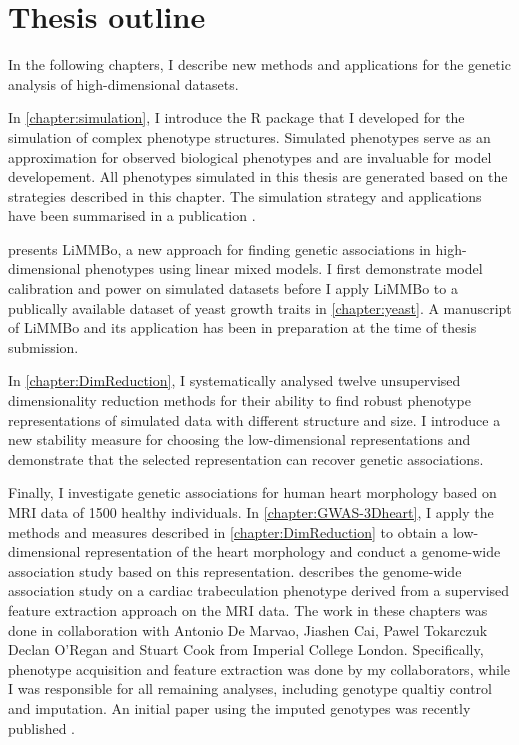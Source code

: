 \section{Thesis outline}
In the following chapters, I describe new methods and applications for the genetic analysis of high-dimensional datasets. 

In \cref{chapter:simulation}, I introduce the R package that I developed for the simulation of complex phenotype structures. Simulated phenotypes serve as an approximation for observed biological phenotypes and are invaluable for model developement. All phenotypes simulated in this thesis are generated based on the strategies described in this chapter. The simulation strategy and applications have been summarised in a publication \citep[\textit{under revision}]{Meyer2017a}.

 presents LiMMBo, a new approach for finding genetic associations in high-dimensional phenotypes using linear mixed models. I first demonstrate model calibration and power on simulated datasets before I apply LiMMBo to a publically available dataset of yeast growth traits in \cref{chapter:yeast}. A manuscript of LiMMBo and its application has been in preparation at the time of thesis submission.

In \cref{chapter:DimReduction}, I systematically analysed twelve unsupervised dimensionality reduction methods for their ability to find robust phenotype representations of simulated data with different structure and size. I introduce a new stability measure for choosing the low-dimensional representations and demonstrate that the selected representation can recover genetic associations.

Finally, I investigate genetic associations for human heart morphology based on MRI data of \num{1500} healthy individuals. In \cref{chapter:GWAS-3Dheart}, I apply the methods and measures described in  \cref{chapter:DimReduction} to obtain a low-dimensional representation of the heart morphology and conduct a genome-wide association study based on this representation.  describes the genome-wide association study on a cardiac trabeculation phenotype derived from a supervised feature extraction approach on the MRI data.  The work in these chapters was done in collaboration with Antonio De Marvao, Jiashen Cai, Pawel Tokarczuk Declan O'Regan and Stuart Cook from Imperial College London. Specifically, phenotype acquisition and feature extraction was done by my collaborators, while I was responsible for all remaining analyses, including genotype qualtiy control and imputation. An initial paper using the imputed genotypes was recently published \citep{Biffi2017}.





